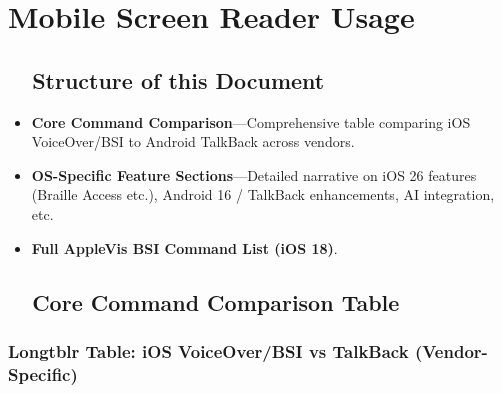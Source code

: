 \chapter{Mobile Screen Reader Usage}

\section{~~Structure of this Document}
\begin{itemize}
	\item \textbf{Core Command Comparison}—Comprehensive table comparing iOS VoiceOver/BSI to Android TalkBack across vendors.
	\item \textbf{OS-Specific Feature Sections}—Detailed narrative on iOS 26 features (Braille Access etc.), Android 16 / TalkBack enhancements, AI integration, etc.
	\item \textbf{Full AppleVis BSI Command List (iOS 18)}.
\end{itemize}

\section{~~Core Command Comparison Table}
\subsection{Longtblr Table: iOS VoiceOver/BSI vs TalkBack (Vendor-Specific)}

